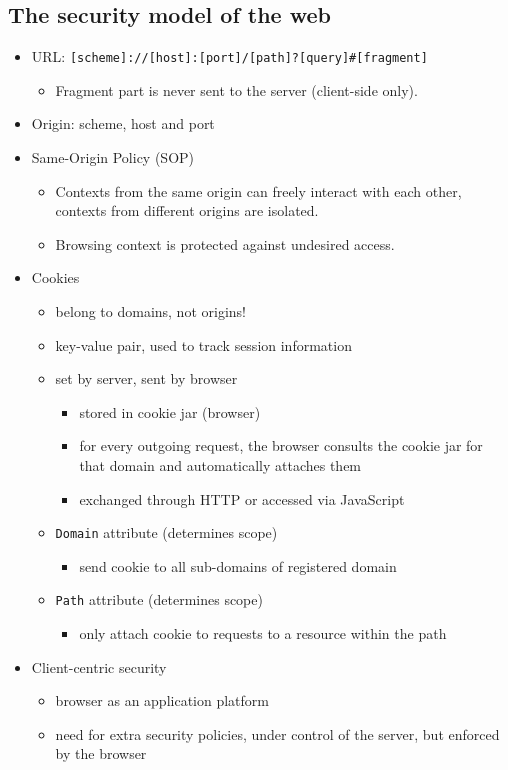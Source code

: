 \documentclass[12pt,titlepage,a4paper]{report}
\begin{document}
	\subsection{The security model of the web}
	\begin{itemize}
		\item URL: \texttt{[scheme]://[host]:[port]/[path]?[query]\#[fragment]}
		\begin{itemize}
			\item Fragment part is never sent to the server (client-side only).
		\end{itemize}
		\item Origin: scheme, host and port
		\item Same-Origin Policy (SOP)
		\begin{itemize}
			\item Contexts from the same origin can freely interact with each other, contexts from different origins are isolated.
			\item Browsing context is protected against undesired access.
		\end{itemize}
		
		\item Cookies
		\begin{itemize}
			\item belong to domains, not origins!
			\item key-value pair, used to track session information
			\item set by server, sent by browser
			\begin{itemize}
				\item stored in cookie jar (browser)
				\item for every outgoing request, the browser consults the cookie jar for that domain and automatically attaches them
				\item exchanged through HTTP or accessed via JavaScript
			\end{itemize}
			\item \texttt{Domain} attribute (determines scope)
			\begin{itemize}
				\item send cookie to all sub-domains of registered domain
			\end{itemize}
			\item \texttt{Path} attribute (determines scope)
			\begin{itemize}
				\item only attach cookie to requests to a resource within the path
			\end{itemize}
		\end{itemize}
		
		\item Client-centric security
		\begin{itemize}
			\item browser as an application platform
			\item need for extra security policies, under control of the server, but enforced by the browser
		\end{itemize}
	\end{itemize}
\end{document}
